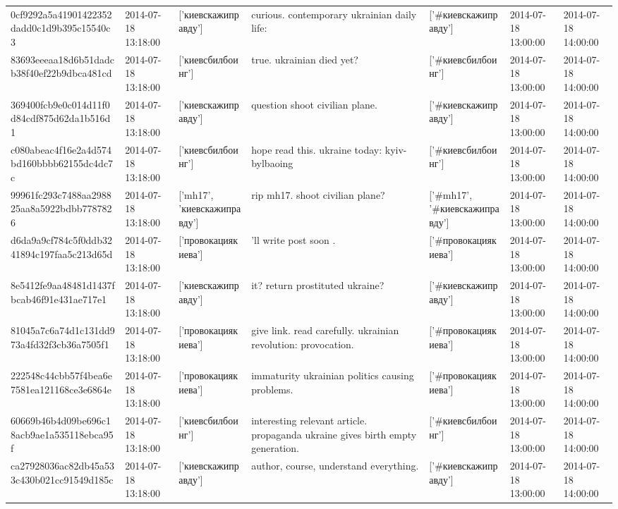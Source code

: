 \begin{tabular}{lllllll}
0cf9292a5a41901422352dadd0c1d9b395c15540c3 & 2014-07-18 13:18:00 & ['киевскажиправду'] & curious. contemporary ukrainian daily life: & ['#киевскажиправду'] & 2014-07-18 13:00:00 & 2014-07-18 14:00:00 \\
83693eeeaa18d6b51dadcb38f40ef22b9dbca481cd & 2014-07-18 13:18:00 & ['киевсбилбоинг'] & true. ukrainian died yet? & ['#киевсбилбоинг'] & 2014-07-18 13:00:00 & 2014-07-18 14:00:00 \\
369400fcb9e0c014d11f0d84cdf875d62da1b516d1 & 2014-07-18 13:18:00 & ['киевскажиправду'] & question shoot civilian plane. & ['#киевскажиправду'] & 2014-07-18 13:00:00 & 2014-07-18 14:00:00 \\
c080abeac4f16e2a4d574bd160bbbb62155dc4dc7c & 2014-07-18 13:18:00 & ['киевсбилбоинг'] & hope read this. ukraine today: kyiv-bylbaoing & ['#киевсбилбоинг'] & 2014-07-18 13:00:00 & 2014-07-18 14:00:00 \\
99961fc293c7488aa298825aa8a5922bdbb7787826 & 2014-07-18 13:18:00 & ['mh17', 'киевскажиправду'] & rip mh17. shoot civilian plane? & ['#mh17', '#киевскажиправду'] & 2014-07-18 13:00:00 & 2014-07-18 14:00:00 \\
d6da9a9cf784c5f0ddb3241894c197faa5c213d65d & 2014-07-18 13:18:00 & ['провокациякиева'] & 'll write post soon . & ['#провокациякиева'] & 2014-07-18 13:00:00 & 2014-07-18 14:00:00 \\
8e5412fe9aa48481d1437fbcab46f91e431ae717e1 & 2014-07-18 13:18:00 & ['киевскажиправду'] & it? return prostituted ukraine? & ['#киевскажиправду'] & 2014-07-18 13:00:00 & 2014-07-18 14:00:00 \\
81045a7c6a74d1c131dd973a4fd32f3cb36a7505f1 & 2014-07-18 13:18:00 & ['провокациякиева'] & give link. read carefully. ukrainian revolution: provocation. & ['#провокациякиева'] & 2014-07-18 13:00:00 & 2014-07-18 14:00:00 \\
222548c44cbb57f4bea6e7581ea121168ce3e6864e & 2014-07-18 13:18:00 & ['провокациякиева'] & immaturity ukrainian politics causing problems. & ['#провокациякиева'] & 2014-07-18 13:00:00 & 2014-07-18 14:00:00 \\
60669b46b4d09be696c18acb9ae1a535118ebca95f & 2014-07-18 13:18:00 & ['киевсбилбоинг'] & interesting relevant article. propaganda ukraine gives birth empty generation. & ['#киевсбилбоинг'] & 2014-07-18 13:00:00 & 2014-07-18 14:00:00 \\
ca27928036ac82db45a533c430b021cc91549d185c & 2014-07-18 13:18:00 & ['киевскажиправду'] & author, course, understand everything. & ['#киевскажиправду'] & 2014-07-18 13:00:00 & 2014-07-18 14:00:00 \\

\end{tabular}
